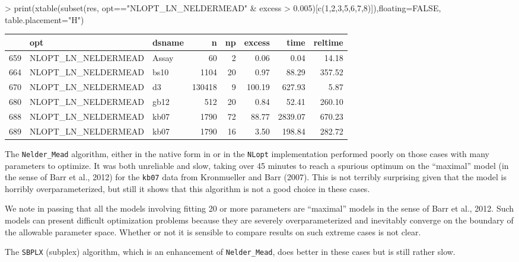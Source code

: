 \documentclass[article]{jss}
\begin{document}
\begin{Schunk}
\begin{Sinput}
> print(xtable(subset(res, opt=="NLOPT_LN_NELDERMEAD" & excess > 0.005)[c(1,2,3,5,6,7,8)]),floating=FALSE, table.placement="H")
\end{Sinput}
\begin{tabular}{rllrrrrr}
  \hline
 & opt & dsname & n & np & excess & time & reltime \\ 
  \hline
659 & NLOPT\_LN\_NELDERMEAD & Assay &  60 &   2 & 0.06 & 0.04 & 14.18 \\ 
  664 & NLOPT\_LN\_NELDERMEAD & bs10 & 1104 &  20 & 0.97 & 88.29 & 357.52 \\ 
  670 & NLOPT\_LN\_NELDERMEAD & d3 & 130418 &   9 & 100.19 & 627.93 & 5.87 \\ 
  680 & NLOPT\_LN\_NELDERMEAD & gb12 & 512 &  20 & 0.84 & 52.41 & 260.10 \\ 
  688 & NLOPT\_LN\_NELDERMEAD & kb07 & 1790 &  72 & 88.77 & 2839.07 & 670.23 \\ 
  689 & NLOPT\_LN\_NELDERMEAD & kb07 & 1790 &  16 & 3.50 & 198.84 & 282.72 \\ 
   \hline
\end{tabular}\end{Schunk}


 The \texttt{Nelder\_Mead} algorithm, either in the native form in
 or in the \texttt{NLopt} implementation performed poorly
on those cases with many parameters to optimize. It was both unreliable
and slow, taking over 45 minutes to reach a spurious optimum on the
``maximal'' model (in the sense of Barr et al., 2012) for the
\texttt{kb07} data from Kronmueller and Barr (2007). This is not
terribly surprising given that the model is horribly overparameterized,
but still it shows that this algorithm is not a good choice in these
cases.

We note in passing that all the models involving fitting 20 or more
parameters are ``maximal'' models in the sense of Barr et al., 2012.
Such models can present difficult optimization problems because they are
severely overparameterized and inevitably converge on the boundary of
the allowable parameter space. Whether or not it is sensible to compare
results on such extreme cases is not clear.

The \texttt{SBPLX} (subplex) algorithm, which is an enhancement of
\texttt{Nelder\_Mead}, does better in these cases but is still rather
slow.
\end{document}
